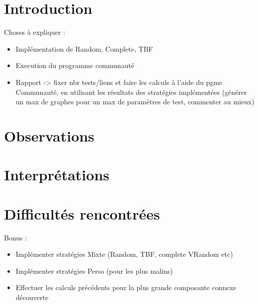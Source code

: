 \documentclass[a4paper]{sig-alternate}
\begin{document}

\section{Introduction}

Choses à expliquer :

\begin{itemize}
\item Implémentation de Random, Complete, TBF
\item Execution du programme communauté
\item Rapport -> fixer nbr tests/liens et faire
les calculs à l'aide du pgme Communauté, en utilisant
les résultats des stratégies implémentées (générer un max de graphes pour
un max de paramètres de test, commenter au mieux)
\end{itemize}




\section{Observations}

\section{Interprétations}

\section{Difficultés rencontrées}



Bonus :
\begin{itemize}
\item Implémenter stratégies Mixte (Random, TBF, complete  VRandom etc)
\item Implémenter stratégies Perso (pour les plus malins)
\item Effectuer les calculs précédents pour la plus grande composante connexe découverte
\end{itemize}
\end{document}
